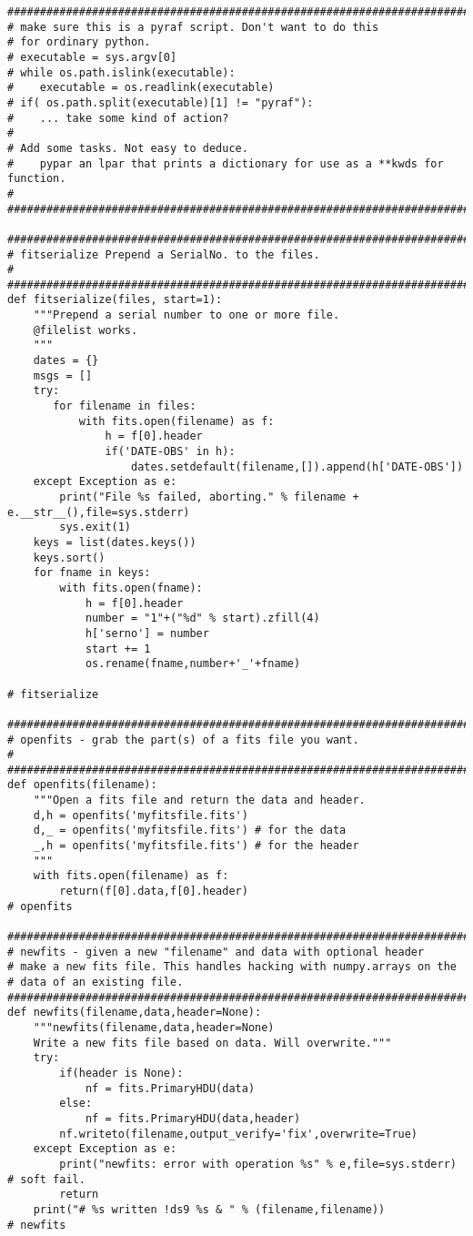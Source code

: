 {\begin{verbatim}
#############################################################################
# make sure this is a pyraf script. Don't want to do this
# for ordinary python.
# executable = sys.argv[0]
# while os.path.islink(executable):
#    executable = os.readlink(executable)
# if( os.path.split(executable)[1] != "pyraf"):
#    ... take some kind of action?
#
# Add some tasks. Not easy to deduce.
#    pypar an lpar that prints a dictionary for use as a **kwds for function.
#
#############################################################################

##############################################################################
# fitserialize Prepend a SerialNo. to the files.
#
##############################################################################
def fitserialize(files, start=1):
    """Prepend a serial number to one or more file.
    @filelist works.
    """
    dates = {}
    msgs = []
    try:
       for filename in files:
           with fits.open(filename) as f:
               h = f[0].header
               if('DATE-OBS' in h):
                   dates.setdefault(filename,[]).append(h['DATE-OBS'])
    except Exception as e:
        print("File %s failed, aborting." % filename + e.__str__(),file=sys.stderr)
        sys.exit(1)
    keys = list(dates.keys())
    keys.sort()
    for fname in keys:
        with fits.open(fname):
            h = f[0].header
            number = "1"+("%d" % start).zfill(4)
            h['serno'] = number
            start += 1
            os.rename(fname,number+'_'+fname)

# fitserialize

##############################################################################
# openfits - grab the part(s) of a fits file you want.
#
##############################################################################
def openfits(filename):
    """Open a fits file and return the data and header.
    d,h = openfits('myfitsfile.fits')
    d,_ = openfits('myfitsfile.fits') # for the data
    _,h = openfits('myfitsfile.fits') # for the header
    """
    with fits.open(filename) as f:
        return(f[0].data,f[0].header)
# openfits

#############################################################################
# newfits - given a new "filename" and data with optional header
# make a new fits file. This handles hacking with numpy.arrays on the
# data of an existing file.
#############################################################################
def newfits(filename,data,header=None):
    """newfits(filename,data,header=None)
    Write a new fits file based on data. Will overwrite."""
    try:
        if(header is None):
            nf = fits.PrimaryHDU(data)
        else:
            nf = fits.PrimaryHDU(data,header)
        nf.writeto(filename,output_verify='fix',overwrite=True)
    except Exception as e:
        print("newfits: error with operation %s" % e,file=sys.stderr) # soft fail.
        return
    print("# %s written !ds9 %s & " % (filename,filename))
# newfits


\end{verbatim}}

